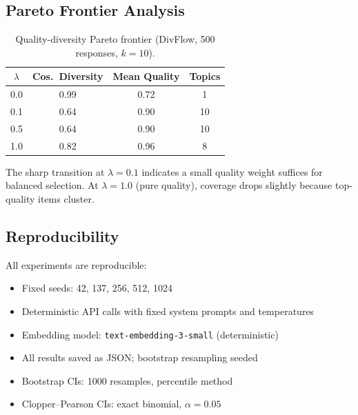 \documentclass[10pt]{article}
\begin{document}
\subsection{Pareto Frontier Analysis}

\begin{table}[H]
\centering
\caption{Quality-diversity Pareto frontier (DivFlow, 500 responses, $k{=}10$).}
\label{tab:pareto}
\begin{tabular}{cccc}
\toprule
$\lambda$ & \textbf{Cos.\ Diversity} & \textbf{Mean Quality} & \textbf{Topics} \\
\midrule
0.0 & 0.99 & 0.72 & 1 \\
0.1 & 0.64 & 0.90 & 10 \\
0.5 & 0.64 & 0.90 & 10 \\
1.0 & 0.82 & 0.96 & 8 \\
\bottomrule
\end{tabular}
\end{table}

The sharp transition at $\lambda = 0.1$ indicates a small quality weight suffices for balanced selection.
At $\lambda = 1.0$ (pure quality), coverage drops slightly because top-quality items cluster.

\subsection{Reproducibility}

All experiments are reproducible:
\begin{itemize}[leftmargin=*,itemsep=1pt]
\item Fixed seeds: 42, 137, 256, 512, 1024
\item Deterministic API calls with fixed system prompts and temperatures
\item Embedding model: \texttt{text-embedding-3-small} (deterministic)
\item All results saved as JSON; bootstrap resampling seeded
\item Bootstrap CIs: 1000 resamples, percentile method
\item Clopper--Pearson CIs: exact binomial, $\alpha = 0.05$
\end{itemize}
\end{document}
